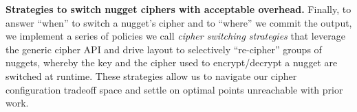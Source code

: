 \textbf{Strategies to switch nugget ciphers with acceptable overhead.} Finally,
to answer ``when'' to switch a nugget's cipher and to ``where'' we commit the
output, we implement a series of policies we call \textit{cipher switching
strategies} that leverage the generic cipher API and drive layout to selectively
``re-cipher'' groups of nuggets, whereby the key and the cipher used to
encrypt/decrypt a nugget are switched at runtime. These strategies allow us to
navigate our cipher configuration tradeoff space and settle on optimal points
unreachable with prior work.

